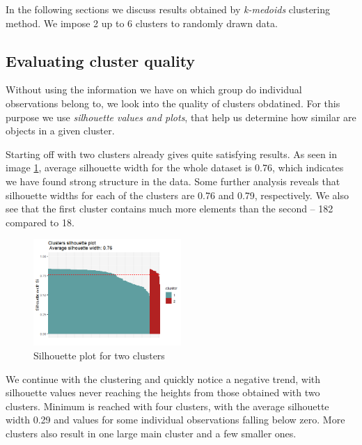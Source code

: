 \documentclass[12pt]{article}
\begin{document}
In the following sections we discuss results obtained by \textit{k-medoids} clustering method. We impose 2 up to 6 clusters to randomly drawn data.

\subsection{Evaluating cluster quality}
Without using the information we have on which group do individual observations belong to, we look into the quality of clusters obdatined. For this purpose we 
use \textit{silhouette values and plots}, that help us determine how similar are objects in a given cluster.

Starting off with two clusters already gives quite satisfying results. As seen in image \ref{fig:silhouette_pam2}, average silhouette width for the whole dataset is 0.76,
which indicates we have found strong structure in the data.
Some further analysis reveals that silhouette widths for each of the clusters are 0.76 and 0.79, respectively. We also see that the first cluster contains much more elements than
the second -- 182 compared to 18.

\begin{figure}[h]
  \begin{center}
    \includegraphics[width = 0.5\textwidth]{../images/project2/silhouette_pam2.png}
    \caption{Silhouette plot for two clusters}
    \label{fig:silhouette_pam2}
  \end{center}
\end{figure}

We continue with the clustering and quickly notice a negative trend, with silhouette values never reaching the heights from those obtained with two clusters.
Minimum is reached with four clusters, with the average silhouette width 0.29 and values for some individual observations falling below zero. More clusters also
result in one large main cluster and a few smaller ones.
\end{document}
